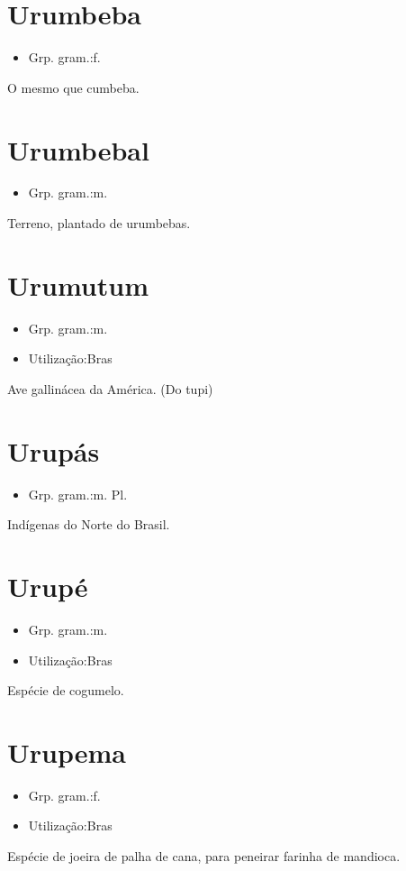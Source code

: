 \documentclass{article}
\begin{document}
\section{Urumbeba}
\begin{itemize}
\item {Grp. gram.:f.}
\end{itemize}
O mesmo que \textunderscore cumbeba\textunderscore .
\section{Urumbebal}
\begin{itemize}
\item {Grp. gram.:m.}
\end{itemize}
Terreno, plantado de urumbebas.
\section{Urumutum}
\begin{itemize}
\item {Grp. gram.:m.}
\end{itemize}
\begin{itemize}
\item {Utilização:Bras}
\end{itemize}
Ave gallinácea da América.
(Do tupi)
\section{Urupás}
\begin{itemize}
\item {Grp. gram.:m. Pl.}
\end{itemize}
Indígenas do Norte do Brasil.
\section{Urupé}
\begin{itemize}
\item {Grp. gram.:m.}
\end{itemize}
\begin{itemize}
\item {Utilização:Bras}
\end{itemize}
Espécie de cogumelo.
\section{Urupema}
\begin{itemize}
\item {Grp. gram.:f.}
\end{itemize}
\begin{itemize}
\item {Utilização:Bras}
\end{itemize}
Espécie de joeira de palha de cana, para peneirar farinha de mandioca.
\end{document}
